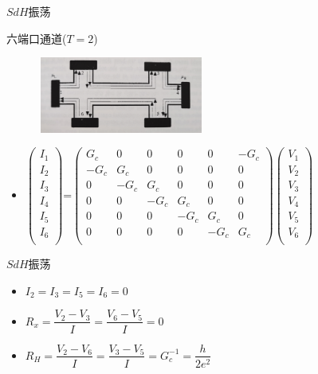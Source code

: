 \documentclass{beamer}
\begin{document}
\begin{frame}{$SdH$振荡}
	\begin{block}{六端口通道($T=2$)}
			\begin{figure}[H]
			\begin{center}
				\includegraphics[width=5.5cm,height=2.5cm]{pic/10.jpg}
			\end{center}
		\end{figure}
	\begin{itemize}
		\item $\begin{pmatrix}
			I_{1}\\
			I_{2}\\
			I_{3}\\
			I_{4}\\
			I_{5}\\
			I_{6}\\
		\end{pmatrix}$=$\begin{pmatrix}
		G_{c}&0&0&0&0&-G_{c}\\
		-G_{c}&G_{c}&0&0&0&0\\
		0&-G_{c}&G_{c}&0&0&0\\
		0&0&-G_{c}&G_{c}&0&0\\
		0&0&0&-G_{c}&G_{c}&0\\
		0&0&0&0&-G_{c}&G_{c}\\
	\end{pmatrix}$$\begin{pmatrix}
	V_{1}\\
	V_{2}\\
	V_{3}\\
	V_{4}\\
	V_{5}\\
	V_{6}\\
\end{pmatrix}$
	\end{itemize}
	\end{block}
\end{frame}
\begin{frame}{$SdH$振荡}
	\begin{itemize}
		\item $I_{2}=I_{3}=I_{5}=I_{6}=0$
		\item $R_{x}=\dfrac{V_{2}-V_{3}}{I}=\dfrac{V_{6}-V_{5}}{I}=0$
		\item $R_{H}=\dfrac{V_{2}-V_{6}}{I}=\dfrac{V_{3}-V_{5}}{I}=G_{c}^{-1}=\dfrac{h}{2e^{2}}$
	\end{itemize}
\end{frame}
\end{document}
